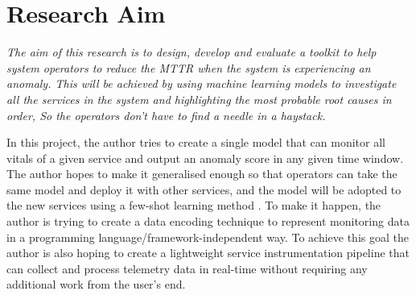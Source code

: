 \section{Research Aim}

\textit{The aim of this research is to design, develop and evaluate a toolkit to help system operators to reduce the MTTR when the system is experiencing an anomaly. This will be achieved by using machine learning models to investigate all the services in the system and highlighting the most probable root causes in order, So the operators don’t have to find a needle in a haystack.}

In this project, the author tries to create a single model that can monitor all vitals of a given service and output an anomaly score in any given time window. The author hopes to make it generalised enough so that operators can take the same model and deploy it with other services, and the model will be adopted to the new services using a few-shot learning method \citep{wang2020generalizing}. To make it happen, the author is trying to create a data encoding technique to represent monitoring data in a programming language/framework-independent way. To achieve this goal the author is also hoping to create a lightweight service instrumentation pipeline that can collect and process telemetry data in real-time without requiring any additional work from the user's end.